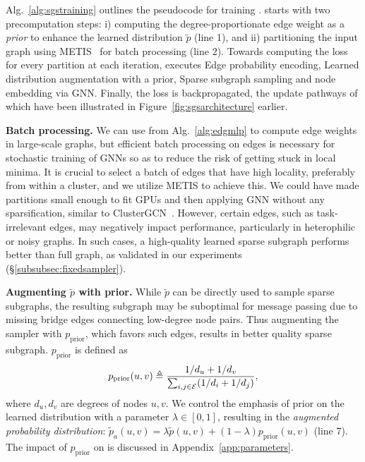 Alg.~\ref{alg:sgstraining} outlines the pseudocode for training \sgs. \sgs starts with two precomputation steps:
i) computing the degree-proportionate edge weight as a \emph{prior} to enhance the learned distribution $\tilde{p}$ (line 1), and
ii) partitioning the input graph using METIS~\cite{karypis1997metis} for batch processing (line 2). Towards computing the loss for every partition at each iteration,  \sgs executes Edge probability encoding, Learned distribution augmentation with a prior, Sparse subgraph sampling and node embedding via GNN. Finally, the loss is backpropagated, the update pathways of which have been illustrated in Figure~\ref{fig:sgsarchitecture} earlier.

\textbf{Batch processing.} 
We can use \edgemlp from Alg.~\ref{alg:edgmlp} to compute edge weights in large-scale graphs, but efficient batch processing on edges is necessary for stochastic training of GNNs so as to reduce the risk of getting stuck in local minima.
It is crucial to select a batch of edges that have high locality, preferably from within a cluster, and we utilize METIS to achieve this. We could have made partitions small enough to fit GPUs and then applying GNN without any sparsification, similar to ClusterGCN~\cite{chiang2019cluster}. However, certain edges, such as task-irrelevant edges, may negatively impact performance, particularly in heterophilic or noisy graphs. In such cases, a high-quality learned sparse subgraph performs better than full graph, as validated in our experiments (\S\ref{subsubsec:fixedsampler}). 

\textbf{Augmenting $\tilde{p}$ with prior.} 
While $\tilde{p}$ can be directly used to sample sparse subgraphs, the resulting subgraph may be suboptimal for message passing due to missing bridge edges connecting low-degree node pairs.
Thus augmenting the sampler with  $p_\mathrm{prior}$, which favors such edges, results in better quality sparse subgraph. $p_\mathrm{prior}$ is defined as
\vspace{-8pt}
\begin{equation}
\label{eq:prior}
 p_\mathrm{prior}(u,v) \triangleq \frac{1/d_u + 1/d_v}{\sum_{i,j\in {\mathcal{E}}} (1/d_i + 1/d_j)},
\end{equation}
where $d_u,d_v$ are degrees of nodes $u,v$. We control the emphasis of prior on the learned distribution with a parameter $\lambda \in [0,1]$, resulting in the \emph{augmented probability distribution}: $\tilde{p}_{a}(u,v) = \lambda \tilde{p}(u,v) + (1-\lambda) p_\mathrm{prior}(u,v)$ (line 7). The impact of $p_\mathrm{prior}$ on \sgs is discussed in Appendix~\ref{app:parameters}.

